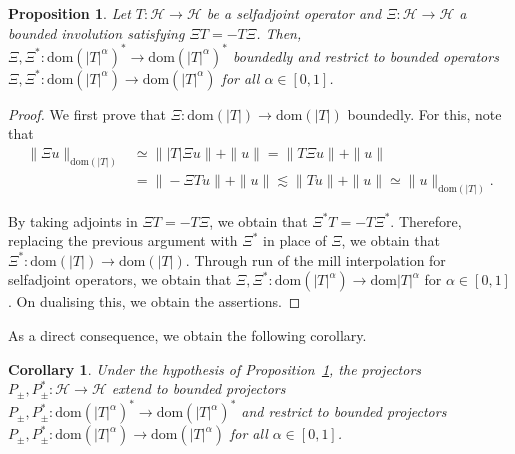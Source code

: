 \documentclass[a4paper,10pt,reqno]{amsart}
\newcommand{\modulus}[1]{|#1|}
\newcommand{\norm}[1]{\| #1 \|}%
\newcommand{\Hil}{\mathscr{H}}
\newcommand{\dom}{\mathrm{dom}}
\newtheorem{corollary}[theorem]{Corollary}
\newtheorem{proposition}[theorem]{Proposition}
\theoremstyle{definition}
\begin{document}
\begin{proposition}
\label{Prop:IdemProjs}
Let $T:\Hil \to \Hil$ be a selfadjoint operator and $\Xi: \Hil \to \Hil$  a bounded involution satisfying $\Xi T = - T\Xi$.
Then, $\Xi, \Xi^\ast: \dom(\modulus{T}^\alpha)^\ast \to  \dom(\modulus{T}^\alpha)^\ast$ boundedly and restrict to bounded operators $\Xi, \Xi^\ast: \dom(\modulus{T}^\alpha) \to  \dom(\modulus{T}^\alpha)$ for all $\alpha \in [0, 1]$.
\end{proposition}
\begin{proof}
We first prove that $\Xi:\dom(\modulus{T}) \to \dom(\modulus{T})$ boundedly.
For this, note that
\begin{align*}
\norm{\Xi u}_{\dom(\modulus{T})}
 & \simeq \norm{\modulus{T}\Xi u} + \norm{u}
= \norm{T \Xi u} + \norm{u}                  \\
 & = \norm{- \Xi T u} + \norm{u}
\lesssim \norm{Tu} + \norm{u}
\simeq \norm{u}_{\dom(\modulus{T})}.
\end{align*}

By taking adjoints in $\Xi T = - T \Xi$, we obtain that $\Xi^\ast T = - T \Xi^\ast$.
Therefore, replacing the previous argument with $\Xi^\ast$ in place of $\Xi$, we obtain that $\Xi^\ast: \dom(\modulus{T}) \to \dom(\modulus{T})$.
Through run of the mill interpolation for selfadjoint operators, we obtain that $\Xi, \Xi^\ast: \dom(\modulus{T}^\alpha) \to \dom{\modulus{T}^\alpha}$ for $\alpha \in [0,1]$.
On dualising this, we obtain the assertions.
\end{proof}

As a direct consequence, we obtain the following corollary.
\begin{corollary}
\label{Cor:IdemProjs}
Under the hypothesis of Proposition~\ref{Prop:IdemProjs}, the projectors $P_{\pm}, P_{\pm}^\ast: \Hil \to \Hil$ extend to bounded projectors $P_{\pm}, P_{\pm}^\ast: \dom(\modulus{T}^\alpha)^\ast \to \dom(\modulus{T}^\alpha)^\ast$ and restrict to bounded projectors $P_{\pm}, P_{\pm}^\ast: \dom(\modulus{T}^\alpha) \to \dom(\modulus{T}^\alpha)$ for all $\alpha \in [0,1]$.
\end{corollary}



\end{document}
